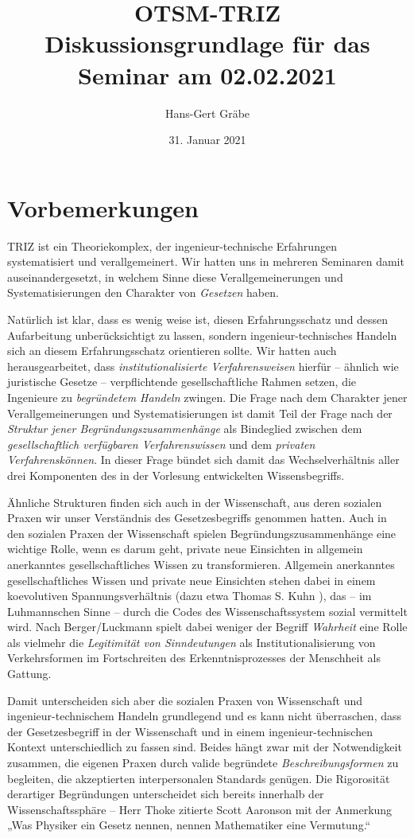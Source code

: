 \documentclass[11pt,a4paper]{article}
\title{OTSM-TRIZ\\[6pt]\Large Diskussionsgrundlage für das Seminar am
  02.02.2021}
\author{Hans-Gert Gr\"abe}
\date{31. Januar 2021}
\begin{document}
\maketitle

\section{Vorbemerkungen}

TRIZ ist ein Theoriekomplex, der ingenieur-technische Erfahrungen
systematisiert und verallgemeinert. Wir hatten uns in mehreren Seminaren damit
auseinandergesetzt, in welchem Sinne diese Verallgemeinerungen und
Systematisierungen den Charakter von \emph{Gesetzen} haben.

Natürlich ist klar, dass es wenig weise ist, diesen Erfahrungsschatz und
dessen Aufarbeitung unberücksichtigt zu lassen, sondern ingenieur-technisches
Handeln sich an diesem Erfahrungs\-schatz orientieren sollte. Wir hatten auch
herausgearbeitet, dass \emph{institutionalisierte Verfahrensweisen} hierfür --
ähnlich wie juristische Gesetze -- verpflichtende gesellschaftliche Rahmen
setzen, die Ingenieure zu \emph{begründetem Handeln} zwingen. Die Frage nach
dem Charakter jener Verallgemeinerungen und Systematisierungen ist damit Teil
der Frage nach der \emph{Struktur jener Begründungszusammenhänge} als
Bindeglied zwischen dem \emph{gesellschaftlich verfügbaren Verfahrenswissen}
und dem \emph{privaten Verfahrenskönnen}. In dieser Frage bündet sich damit
das Wechselverhältnis aller drei Komponenten des in der Vorlesung entwickelten
Wissensbegriffs.

Ähnliche Strukturen finden sich auch in der Wissenschaft, aus deren sozialen
Praxen wir unser Verständnis des Gesetzesbegriffs genommen hatten.  Auch in
den sozialen Praxen der Wissenschaft spielen Begründungszusammenhänge eine
wichtige Rolle, wenn es darum geht, private neue Einsichten in allgemein
anerkanntes gesellschaftliches Wissen zu transformieren.  Allgemein
anerkanntes gesellschaftliches Wissen und private neue Einsichten stehen dabei
in einem koevolutiven Spannungsverhältnis (dazu etwa Thomas S. Kuhn
\cite{Kuhn1962}), das -- im Luhmannschen Sinne -- durch die Codes des
Wissenschaftssystem sozial vermittelt wird.  Nach Berger/Luckmann
\cite{Berger1969} spielt dabei weniger der Begriff \emph{Wahrheit} eine Rolle
als vielmehr die \emph{Legitimität von Sinndeutungen} als
Institutionalisierung von Verkehrsformen im Fortschreiten des
Erkenntnisprozesses der Menschheit als Gattung.

Damit unterscheiden sich aber die sozialen Praxen von Wissenschaft und
ingenieur-techni\-schem Handeln grundlegend und es kann nicht überraschen,
dass der Gesetzesbegriff in der Wissenschaft und in einem
ingenieur-technischen Kontext unterschiedlich zu fassen sind. Beides hängt
zwar mit der Notwendigkeit zusammen, die eigenen Praxen durch valide
begründete \emph{Beschreibungsformen} zu begleiten, die akzeptierten
interpersonalen Standards genügen. Die Rigorosität derartiger Begründungen
unterscheidet sich bereits innerhalb der Wissenschafts\-sphäre -- Herr Thoke
zitierte Scott Aaronson mit der Anmerkung „Was Physiker ein Gesetz nennen,
nennen Mathematiker eine Vermutung.“
\end{document}
